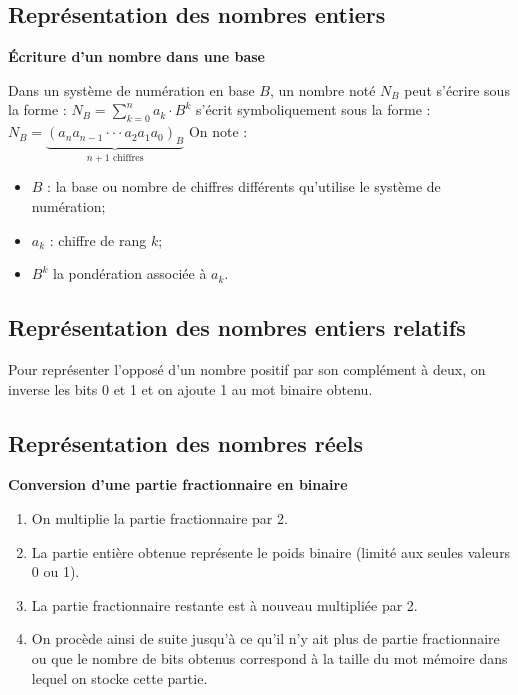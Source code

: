 \documentclass[10pt,fleqn]{article} %
\begin{document}

\vspace{2cm}
\pagestyle{fancy}
\thispagestyle{plain}

\subsection*{Représentation des nombres entiers}
\begin{defi}\textbf{Écriture d'un nombre dans une base}

Dans un système de numération en base $B$, un nombre noté $N_B$ peut s'écrire sous la forme : $N_B = \sum\limits_{k=0}^{n} a_k \cdot B^k $
s'écrit symboliquement sous la forme : 
$
N_B = \underbrace{\left(a_n a_{n-1} \cdot \cdot \cdot a_2 a_1 a_0\right)_B}_{n+1 \text{ chiffres}}
$
On note : 
\begin{itemize}
\item $B$ : la base ou nombre de chiffres différents qu'utilise le système de numération;
\item $a_k$ : chiffre de rang $k$;
\item $B^k$ la pondération associée à $a_k$.
\end{itemize}

\end{defi}

\subsection*{Représentation des nombres entiers relatifs}

\begin{methode} 
Pour représenter l’opposé d’un nombre positif par son complément à deux, on inverse les bits 0 et 1 et on ajoute 1 au mot binaire obtenu.
\end{methode}

\subsection*{Représentation des nombres réels}
\begin{methode}
\textbf{Conversion d'une partie fractionnaire en binaire}

\begin{enumerate}
\item On multiplie la partie fractionnaire par 2. 
\item La partie entière obtenue représente le poids binaire (limité aux seules valeurs 0 ou 1). 
\item La partie fractionnaire restante est à nouveau multipliée par 2.
\item On procède ainsi de suite jusqu’à ce qu’il n’y ait plus de partie fractionnaire ou que le nombre de bits obtenus correspond à la taille du mot mémoire dans lequel on stocke cette partie.
\end{enumerate}
\end{methode}
\end{document}
